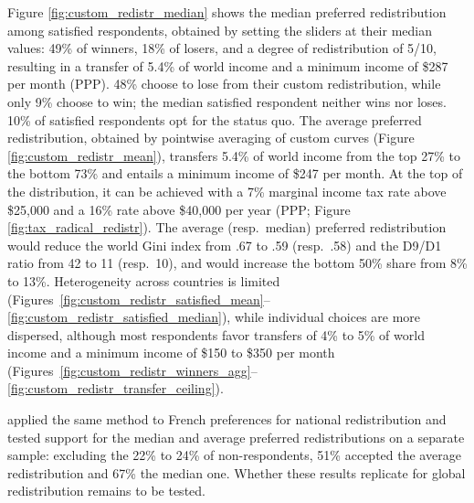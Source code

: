 \documentclass[12pt,english]{article}
\begin{document}
Figure \ref{fig:custom_redistr_median} shows the median preferred redistribution among satisfied respondents, obtained by setting the sliders at their median values: 49\% of winners, 18\% of losers, and a degree of redistribution of 5/10, resulting in a transfer of 5.4\% of world income and a minimum income of \$287 per month (PPP). 48\% choose to lose from their custom redistribution, while only 9\% choose to win; the median satisfied respondent neither wins nor loses. 10\% of satisfied respondents opt for the status quo. The average preferred redistribution, obtained by pointwise averaging of custom curves (Figure \ref{fig:custom_redistr_mean}), transfers 5.4\% of world income from the top 27\% to the bottom 73\% and entails a minimum income of \$247 per month. At the top of the distribution, it can be achieved with a 7\% marginal income tax rate above \$25,000 and a 16\% rate above \$40,000 per year (PPP; Figure \ref{fig:tax_radical_redistr}). The average (resp.\ median) preferred redistribution would reduce the world Gini index from .67 to .59 (resp.\ .58) and the D9/D1 ratio from 42 to 11 (resp.\ 10), and would increase the bottom 50\% share from 8\% to 13\%. Heterogeneity across countries is limited (Figures~\ref{fig:custom_redistr_satisfied_mean}--\ref{fig:custom_redistr_satisfied_median}), while individual choices are more dispersed, although most respondents favor transfers of 4\% to 5\% of world income and a minimum income of \$150 to \$350 per month (Figures~\ref{fig:custom_redistr_winners_agg}--\ref{fig:custom_redistr_transfer_ceiling}).

\cite{fabre_french_2022} applied the same method to French preferences for national redistribution and tested support for the median and average preferred redistributions on a separate sample: excluding the 22\% to 24\% of non-respondents, 51\% accepted the average redistribution and 67\% the median one. Whether these results replicate for global redistribution remains to be tested.

\clearpage


\clearpage
\singlespacing


\end{document}
